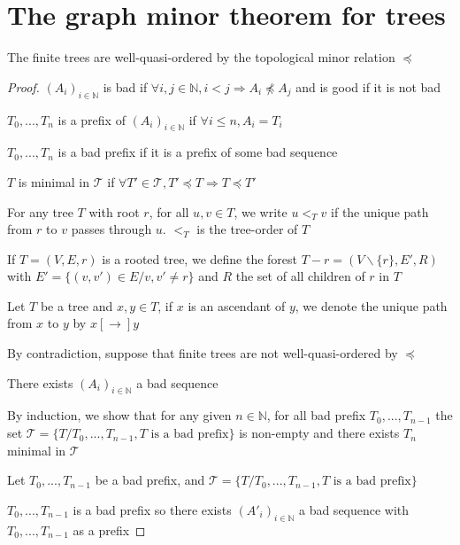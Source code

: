 \section{The graph minor theorem for trees}

\begin{theorem}[Kruskal 1960]
  \label{theo:Kruskal}  
  The finite trees are well-quasi-ordered by the topological minor relation \(\preceq\)
\end{theorem}

\begin{proof}
  \(\left(A_i\right)_{i\in\mathbb{N}}\) is bad if \(\forall i,j\in\mathbb{N}, i<j\Rightarrow A_i\npreceq A_j\) and is good if it is not bad

  \(T_0,...,T_n\) is a prefix of \(\left(A_i\right)_{i\in\mathbb{N}}\) if \(\forall i\leq n, A_i=T_i\)

  \(T_0,...,T_n\) is a bad prefix if it is a prefix of some bad sequence

  \(T\) is minimal in \(\mathcal{T}\) if \(\forall T'\in\mathcal{T}, T'\preceq T\Rightarrow T\preceq T'\)

  For any tree \(T\) with root \(r\), for all \(u,v\in T\), we write \(u<_Tv\) if the unique path from \(r\) to \(v\) passes through \(u\). \(<_T\) is the tree-order of \(T\)

  If \(T=(V,E,r)\) is a rooted tree, we define the forest \(T-r=(V\backslash\{r\},E',R)\) with \(E'=\{(v,v')\in E/v,v'\neq r\}\) and \(R\) the set of all children of \(r\) in \(T\)

  Let \(T\) be a tree and \(x,y\in T\), if \(x\) is an ascendant of \(y\), we denote the unique path from \(x\) to \(y\) by \(x[\to]y\)
  
  By contradiction, suppose that finite trees are not well-quasi-ordered by \(\preceq\)

  There exists \(\left(A_i\right)_{i\in\mathbb{N}}\) a bad sequence

  By induction, we show that for any given \(n\in\mathbb{N}\), for all bad prefix \(T_0,...,T_{n-1}\) the set \(\mathcal{T}=\{T/T_0,...,T_{n-1},T\text{ is a bad prefix}\}\) is non-empty and there exists \(T_n\) minimal in \(\mathcal{T}\)
  
  Let \(T_0,...,T_{n-1}\) be a bad prefix, and \(\mathcal{T}=\{T/T_0,...,T_{n-1},T\text{ is a bad prefix}\}\)

  \(T_0,...,T_{n-1}\) is a bad prefix so there exists \(\left(A'_i\right)_{i\in\mathbb{N}}\) a bad sequence with \(T_0,...,T_{n-1}\) as a prefix


\end{proof}
